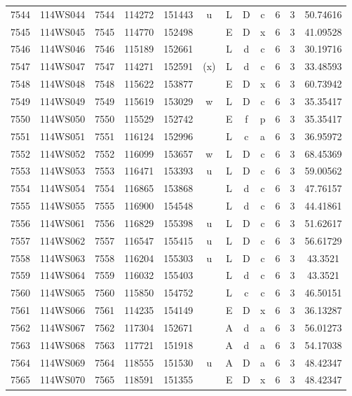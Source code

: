 \begin{tabular}{|*{12}{c|}}
7544 & 114WS044 & 7544 & 114272 & 151443 & u & L & D & c & 6 & 3 & 50.74616 \\ 
7545 & 114WS045 & 7545 & 114770 & 152498 &  & E & D & x & 6 & 3 & 41.09528 \\ 
7546 & 114WS046 & 7546 & 115189 & 152661 &  & L & d & c & 6 & 3 & 30.19716 \\ 
7547 & 114WS047 & 7547 & 114271 & 152591 & (x) & L & d & c & 6 & 3 & 33.48593 \\ 
7548 & 114WS048 & 7548 & 115622 & 153877 &  & E & D & x & 6 & 3 & 60.73942 \\ 
7549 & 114WS049 & 7549 & 115619 & 153029 & w & L & D & c & 6 & 3 & 35.35417 \\ 
7550 & 114WS050 & 7550 & 115529 & 152742 &  & E & f & p & 6 & 3 & 35.35417 \\ 
7551 & 114WS051 & 7551 & 116124 & 152996 &  & L & c & a & 6 & 3 & 36.95972 \\ 
7552 & 114WS052 & 7552 & 116099 & 153657 & w & L & D & c & 6 & 3 & 68.45369 \\ 
7553 & 114WS053 & 7553 & 116471 & 153393 & u & L & D & c & 6 & 3 & 59.00562 \\ 
7554 & 114WS054 & 7554 & 116865 & 153868 &  & L & d & c & 6 & 3 & 47.76157 \\ 
7555 & 114WS055 & 7555 & 116900 & 154548 &  & L & d & c & 6 & 3 & 44.41861 \\ 
7556 & 114WS061 & 7556 & 116829 & 155398 & u & L & D & c & 6 & 3 & 51.62617 \\ 
7557 & 114WS062 & 7557 & 116547 & 155415 & u & L & D & c & 6 & 3 & 56.61729 \\ 
7558 & 114WS063 & 7558 & 116204 & 155303 & u & L & D & c & 6 & 3 & 43.3521 \\ 
7559 & 114WS064 & 7559 & 116032 & 155403 &  & L & d & c & 6 & 3 & 43.3521 \\ 
7560 & 114WS065 & 7560 & 115850 & 154752 &  & L & c & c & 6 & 3 & 46.50151 \\ 
7561 & 114WS066 & 7561 & 114235 & 154149 &  & E & D & x & 6 & 3 & 36.13287 \\ 
7562 & 114WS067 & 7562 & 117304 & 152671 &  & A & d & a & 6 & 3 & 56.01273 \\ 
7563 & 114WS068 & 7563 & 117721 & 151918 &  & A & d & a & 6 & 3 & 54.17038 \\ 
7564 & 114WS069 & 7564 & 118555 & 151530 & u & A & D & a & 6 & 3 & 48.42347 \\ 
7565 & 114WS070 & 7565 & 118591 & 151355 &  & E & D & x & 6 & 3 & 48.42347 \\ 

\end{tabular}
